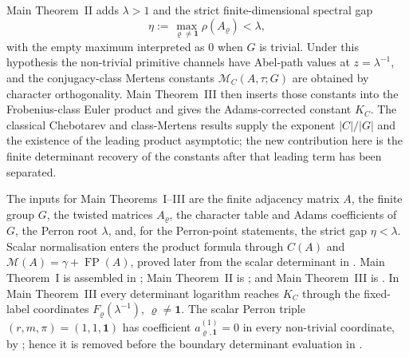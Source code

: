 \documentclass[11pt,a4paper]{amsart}
\theoremstyle{plain}
\theoremstyle{definition}
\theoremstyle{remark}
\DeclareMathOperator{\FP}{FP}
\begin{document}
Main Theorem~II adds \(\lambda>1\) and the strict finite-dimensional
spectral gap
\[
  \eta:=\max_{\varrho\ne\mathbf1}\rho(A_\varrho)<\lambda,
\]
with the empty maximum interpreted as \(0\) when \(G\) is trivial.  Under
this hypothesis the non-trivial primitive channels have Abel-path values at
\(z=\lambda^{-1}\), and the conjugacy-class Mertens constants
\(\mathcal M_C(A,\tau;G)\) are obtained by character orthogonality.
Main Theorem~III then inserts those constants into the Frobenius-class Euler
product and gives the Adams-corrected constant \(K_C\).  The classical
Chebotarev and class-Mertens results supply the exponent \(|C|/|G|\) and the
existence of the leading product asymptotic; the new contribution here is
the finite determinant recovery of the constants after that leading term has
been separated.

The inputs for Main Theorems~I--III are the finite adjacency matrix \(A\), the
finite group \(G\), the twisted matrices \(A_\varrho\), the character table and
Adams coefficients of \(G\), the Perron root \(\lambda\), and, for the
Perron-point statements, the strict gap \(\eta<\lambda\).  Scalar normalisation
enters the product formula through \(C(A)\) and
\(\mathcal M(A)=\gamma+\FP(A)\), proved later from the scalar determinant in
.  Main Theorem~I is assembled in
; Main Theorem~II is
; and Main
Theorem~III is
.
In Main Theorem~III every determinant logarithm reaches \(K_C\) through the
fixed-label coordinates \(F_\varrho(\lambda^{-1})\),
  \(\varrho\ne\mathbf1\).  The scalar Perron triple
  \((r,m,\pi)=(1,1,\mathbf1)\) has coefficient
  \(a_{\varrho,\mathbf1}^{(1)}=0\) in every non-trivial coordinate, by
  ; hence it is removed before the
  boundary determinant evaluation in
  .
\end{document}
